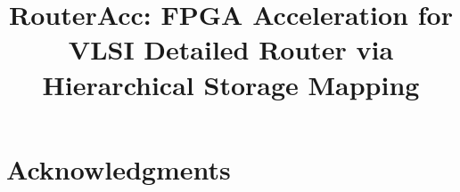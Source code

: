 \documentclass[sigconf,screen]{acmart}
\begin{document}
\title{RouterAcc: FPGA Acceleration for VLSI Detailed Router via Hierarchical Storage Mapping}





\renewcommand{\shortauthors}{Jinhao Li et al.}




\begin{abstract}

\end{abstract}

\maketitle



% 




% 












\section{Acknowledgments}





\end{document}

